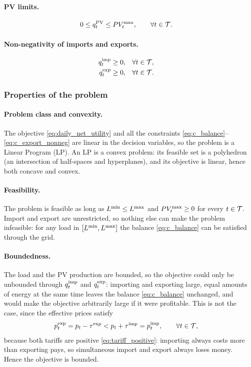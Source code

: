 \paragraph{PV limits.}
\begin{equation}
    0 \leq q^{\mathrm{PV}}_{t} \leq PV_{t}^{\max}, \qquad \forall t \in \mathcal{T}. \label{eq:c_pv_limit}
\end{equation}

\paragraph{Non-negativity of imports and exports.}
\begin{align}
    q^{\mathrm{imp}}_{t} &\geq 0, & \forall t \in \mathcal{T}, \label{eq:c_import_nonneg} \\
    q^{\mathrm{exp}}_{t} &\geq 0, & \forall t \in \mathcal{T}. \label{eq:c_export_nonneg}
\end{align}

\subsubsection{Properties of the problem}

\paragraph{Problem class and convexity.}
The objective \eqref{eq:daily_net_utility} and all the constraints
\eqref{eq:c_balance}--\eqref{eq:c_export_nonneg} are linear in the decision variables, so the
problem is a Linear Program (LP). An LP is a convex problem: its feasible set is a
polyhedron (an intersection of half-spaces and hyperplanes), and its objective is linear,
hence both concave and convex.

\paragraph{Feasibility.}
The problem is feasible as long as $L^{\min} \leq L^{\max}$ and $PV_{t}^{\max} \geq 0$ for every
$t \in \mathcal{T}$. Import and export are unrestricted, so nothing else can make the problem
infeasible: for any load in $[L^{\min}, L^{\max}]$ the balance \eqref{eq:c_balance} can be
satisfied through the grid.

\paragraph{Boundedness.}
The load and the PV production are bounded, so the objective could only be unbounded through
$q^{\mathrm{imp}}_{t}$ and $q^{\mathrm{exp}}_{t}$: importing and exporting large, equal amounts of energy at the same time
leaves the balance \eqref{eq:c_balance} unchanged, and would make the objective arbitrarily
large if it were profitable. This is not the case, since the effective prices satisfy
\begin{equation}
    p^{\mathrm{exp}}_{t} = p_t - \tau^{\mathrm{exp}} < p_t + \tau^{\mathrm{imp}} = p^{\mathrm{imp}}_{t}, \qquad \forall t \in \mathcal{T},
\end{equation}
because both tariffs are positive \eqref{eq:tariff_positive}: importing always costs more than exporting pays, so
simultaneous import and export always loses money. Hence the objective is bounded.

